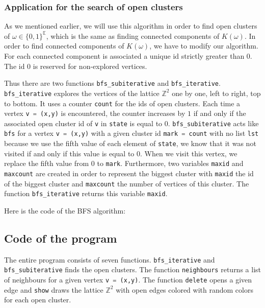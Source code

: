 \documentclass[a4paper,11pt]{article}
\theoremstyle{plain}
\theoremstyle{definition}
\theoremstyle{remark}
\begin{document}
\subsubsection{Application for the search of open clusters}
As we mentioned earlier, we will use this algorithm in order to find open clusters of $\omega \in \{0,1\}^\mathbb{E}$, which is the same as finding connected components of $K(\omega)$. In order to find connected components of $K(\omega)$, we have to modify our algorithm. For each connected component is associated a unique id strictly greater than $0$. The id $0$ is reserved for non-explored vertices.

Thus there are two functions \lstinline[language=Python]{bfs_subiterative} and \lstinline[language=Python]{bfs_iterative}. \lstinline[language=Python]{bfs_iterative} explores the vertices of the lattice $\mathbb{Z}^2$ one by one, left to right, top to bottom. It uses a counter \lstinline[language=Python]{count} for the ids of open clusters. Each time a vertex \lstinline[language=Python]{v = (x,y)} is encountered, the counter increases by $1$ if and only if the associated open cluster id of \lstinline[language=Python]{v} in \lstinline[language=Python]{state} is equal to $0$. \lstinline[language=Python]{bfs_subiterative} acts like \lstinline[language=Python]{bfs} for a vertex \lstinline[language=Python]{v = (x,y)} with a given cluster id  \lstinline[language=Python]{mark = count} with no list \lstinline[language=Python]{lst} because we use the fifth value of each element of \lstinline[language=Python]{state}, we know that it was not visited if and only if this value is equal to $0$. When we visit this vertex, we replace the fifth value from $0$ to \lstinline[language=Python]{mark}. Furthermore, two variables \lstinline[language=Python]{maxid} and \lstinline[language=Python]{maxcount} are created in order to represent the biggest cluster with \lstinline[language=Python]{maxid} the id of the biggest cluster and \lstinline[language=Python]{maxcount} the number of vertices of this cluster. The function \lstinline[language=Python]{bfs_iterative} returns this variable \lstinline[language=Python]{maxid}.

Here is the code of the BFS algorithm:


\subsection{Code of the program}
The entire program consists of seven functions. \lstinline[language=Python]{bfs_iterative} and \lstinline[language=Python]{bfs_subiterative} finds the open clusters. The function \lstinline[language=Python]{neighbours} returns a list of neighbours for a given vertex \lstinline[language=Python]{v = (x,y)}. The function \lstinline[language=Python]{delete} opens a given edge and \lstinline[language=Python]{show} draws the lattice $\mathbb{Z}^2$ with open edges colored with random colors for each open cluster. 
\end{document}

